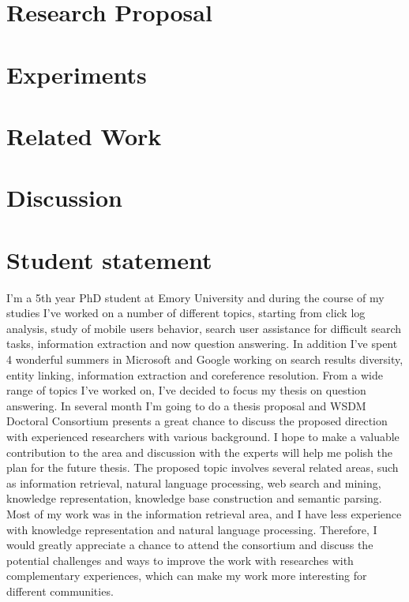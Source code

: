 \documentclass{sig-alternate}
\begin{document}
\section{Research Proposal}


\section{Experiments}


\section{Related Work}


\section{Discussion}


%

%
%
\newpage

\appendix
\section{Student statement}
I'm a 5th year PhD student at Emory University and during the course of my studies I've worked on a number of different topics, starting from click log analysis, study of mobile users behavior, search user assistance for difficult search tasks, information extraction and now question answering.
In addition I've spent 4 wonderful summers in Microsoft and Google working on search results diversity, entity linking, information extraction and coreference resolution.
From a wide range of topics I've worked on, I've decided to focus my thesis on question answering.
In several month I'm going to do a thesis proposal and WSDM Doctoral Consortium presents a great chance to discuss the proposed direction with experienced researchers with various background.
I hope to make a valuable contribution to the area and discussion with the experts will help me polish the plan for the future thesis.
The proposed topic involves several related areas, such as information retrieval, natural language processing, web search and mining, knowledge representation, knowledge base construction and semantic parsing.
Most of my work was in the information retrieval area, and I have less experience with knowledge representation and natural language processing.
Therefore, I would greatly appreciate a chance to attend the consortium and discuss the potential challenges and ways to improve the work with researches with complementary experiences, which can make my work more interesting for different communities.
\end{document}
